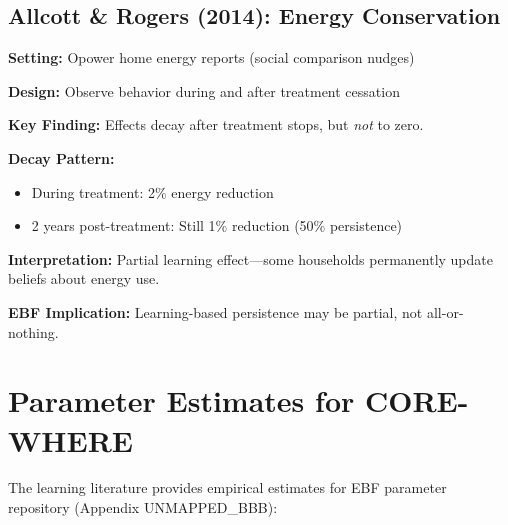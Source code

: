 \documentclass[11pt, a4paper]{article}
\begin{document}
\subsection{Allcott \& Rogers (2014): Energy Conservation}

\begin{tcolorbox}[colback=gray!5!white, colframe=gray!75!black,
    title=Allcott \& Rogers (2014): Persistence of Social Norm Messages]

\textbf{Setting:} Opower home energy reports (social comparison nudges)

\textbf{Design:} Observe behavior during and after treatment cessation

\textbf{Key Finding:} Effects decay after treatment stops, but \textit{not} to zero.

\textbf{Decay Pattern:}
\begin{itemize}[nosep]
    \item During treatment: 2\% energy reduction
    \item 2 years post-treatment: Still 1\% reduction (50\% persistence)
\end{itemize}

\textbf{Interpretation:} Partial learning effect---some households permanently update beliefs about energy use.

\textbf{EBF Implication:} Learning-based persistence may be partial, not all-or-nothing.

\end{tcolorbox}


\section{Parameter Estimates for CORE-WHERE}
\label{sec:lrn-parameters}

The learning literature provides empirical estimates for EBF parameter repository (Appendix UNMAPPED_BBB):
\end{document}
